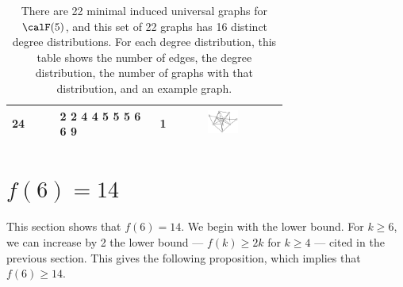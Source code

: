 \begin{table}[h!]
\begin{tabular}{m{0.12\linewidth} m{0.25\linewidth} m{0.12\linewidth} m{0.2\linewidth}}
24 & 2 2 4 4 5 5 5 6 6 9 & 1 & \includegraphics[width=1cm]{15-universal-graphs/img/degree-sequences-example-graphs/graph-5-10-15} \\
\bottomrule
\end{tabular}
\caption{There are 22 minimal induced universal graphs for $\calF(5)$, and this set of
    22 graphs has 16 distinct degree distributions.  For each degree distribution,
    this table shows the number of edges, the
    degree distribution, the number of graphs with that distribution,
    and an example graph.}
\label{tab:f5-degree-distributions}
\end{table}

\section{\texorpdfstring{$f(6) = 14$}{f(6)=14}}\label{sec:f6}

This section shows that $f(6) = 14$.  We begin with the lower bound.
For $k \geq 6$, we can increase by 2 the lower bound --- $f(k) \geq 2k$
for $k \geq 4$ --- cited in the previous section.
This gives the following proposition, which implies that $f(6) \geq 14$.

